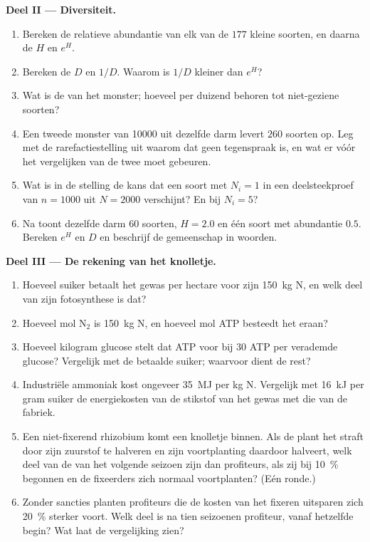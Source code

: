 \begin{problem}
\medskip
\noindent\textbf{Deel II --- Diversiteit.}
\begin{enumerate}[resume]
  \item Bereken de relatieve abundantie van elk van de $177$ kleine
        soorten, en daarna de  $H$ en $e^{H}$.
  \item Bereken de  $D$ en $1/D$. Waarom is $1/D$ kleiner
        dan $e^{H}$?
  \item Wat is de  van het monster; hoeveel  per
        duizend behoren tot niet-geziene soorten?
  \item Een tweede monster van \num{10000}  uit dezelfde darm
        levert $260$ soorten op. Leg met de rarefactiestelling uit
        waarom dat geen tegenspraak is, en wat er vóór het vergelijken
        van de twee moet gebeuren.
  \item Wat is in de stelling de kans dat een soort met $N_{i} = 1$ in
        een deelsteekproef van $n = 1000$ uit $N =
        2000$ verschijnt? En bij $N_{i} = 5$?
  \item Na  toont dezelfde darm $60$ soorten, $H = 2.0$ en
        één soort met abundantie $0.5$. Bereken $e^{H}$ en $D$ en
        beschrijf de gemeenschap in woorden.
\end{enumerate}

\medskip
\noindent\textbf{Deel III --- De rekening van het knolletje.}
\begin{enumerate}[resume]
  \item Hoeveel suiker betaalt het gewas per hectare voor zijn
        \qty{150}{kg} N, en welk deel van zijn fotosynthese is dat?
  \item Hoeveel mol N$_{2}$ is \qty{150}{kg} N, en hoeveel mol ATP
        besteedt het  eraan?
  \item Hoeveel kilogram glucose stelt dat ATP voor bij $30$ ATP per
        verademde glucose? Vergelijk met de betaalde suiker; waarvoor
        dient de rest?
  \item Industriële ammoniak kost ongeveer \qty{35}{MJ} per kg N.
        Vergelijk met \qty{16}{kJ} per gram suiker de energiekosten van
        de stikstof van het gewas met die van de fabriek.
  \item Een niet-fixerend rhizobium komt een knolletje binnen. Als de
        plant het straft door zijn zuurstof te halveren en zijn
        voortplanting daardoor halveert, welk deel van de  van
        het volgende seizoen zijn dan profiteurs, als zij bij
        \qty{10}{\%} begonnen en de fixeerders zich normaal
        voortplanten? (Eén ronde.)
  \item Zonder sancties planten profiteurs die de kosten van het
        fixeren uitsparen zich \qty{20}{\%} sterker voort. Welk deel is
        na tien seizoenen profiteur, vanaf hetzelfde begin? Wat laat de
        vergelijking zien?
\end{enumerate}


\end{problem}

